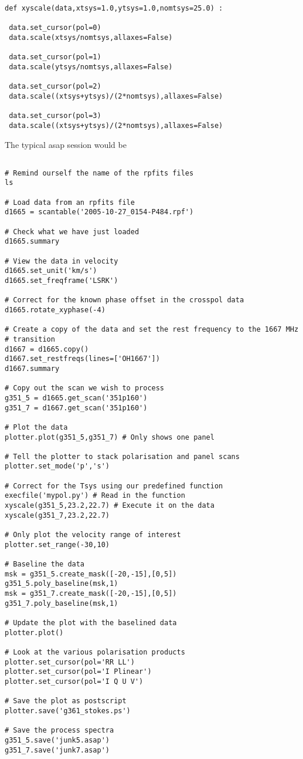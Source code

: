 \documentclass[11pt]{article}
\begin{document}
\begin{verbatim}
def xyscale(data,xtsys=1.0,ytsys=1.0,nomtsys=25.0) :

 data.set_cursor(pol=0)
 data.scale(xtsys/nomtsys,allaxes=False)

 data.set_cursor(pol=1)
 data.scale(ytsys/nomtsys,allaxes=False)

 data.set_cursor(pol=2)
 data.scale((xtsys+ytsys)/(2*nomtsys),allaxes=False)

 data.set_cursor(pol=3)
 data.scale((xtsys+ytsys)/(2*nomtsys),allaxes=False)
\end{verbatim}

The typical asap session would be

\begin{verbatim}
  
# Remind ourself the name of the rpfits files
ls 

# Load data from an rpfits file
d1665 = scantable('2005-10-27_0154-P484.rpf')

# Check what we have just loaded
d1665.summary

# View the data in velocity
d1665.set_unit('km/s')
d1665.set_freqframe('LSRK')

# Correct for the known phase offset in the crosspol data
d1665.rotate_xyphase(-4)

# Create a copy of the data and set the rest frequency to the 1667 MHz 
# transition
d1667 = d1665.copy()
d1667.set_restfreqs(lines=['OH1667'])
d1667.summary

# Copy out the scan we wish to process
g351_5 = d1665.get_scan('351p160')
g351_7 = d1667.get_scan('351p160')

# Plot the data
plotter.plot(g351_5,g351_7) # Only shows one panel

# Tell the plotter to stack polarisation and panel scans
plotter.set_mode('p','s')

# Correct for the Tsys using our predefined function
execfile('mypol.py') # Read in the function
xyscale(g351_5,23.2,22.7) # Execute it on the data
xyscale(g351_7,23.2,22.7)

# Only plot the velocity range of interest
plotter.set_range(-30,10)

# Baseline the data
msk = g351_5.create_mask([-20,-15],[0,5])
g351_5.poly_baseline(msk,1)
msk = g351_7.create_mask([-20,-15],[0,5])
g351_7.poly_baseline(msk,1)

# Update the plot with the baselined data
plotter.plot()

# Look at the various polarisation products
plotter.set_cursor(pol='RR LL')
plotter.set_cursor(pol='I Plinear')
plotter.set_cursor(pol='I Q U V')

# Save the plot as postscript
plotter.save('g361_stokes.ps')

# Save the process spectra
g351_5.save('junk5.asap')
g351_7.save('junk7.asap')

\end{verbatim}
\end{document}
